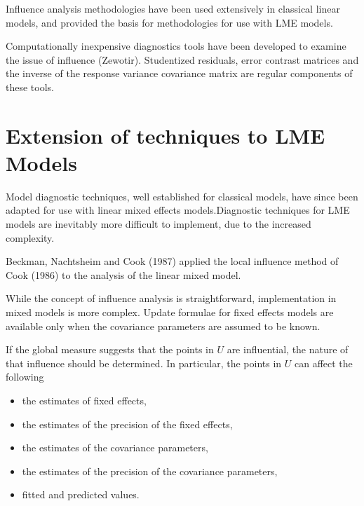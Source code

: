 \documentclass[Main.tex]{subfiles}
\begin{document}
		Influence analysis methodologies have been used extensively in classical linear models, and provided the basis for methodologies for use with LME models.
		
		Computationally inexpensive diagnostics tools have been developed to examine the issue of influence \citep{tewomir} (Zewotir).
		Studentized residuals, error contrast matrices and the inverse of the response variance covariance matrix are regular components of these tools.
		

		

		
		
	
	

		
		\newpage
		\section{Extension of techniques to LME Models} %
		
		Model diagnostic techniques, well established for classical models, have since been adapted for use with linear mixed effects models.Diagnostic techniques for LME models are inevitably more difficult to implement, due to the increased complexity.
		
		Beckman, Nachtsheim and Cook (1987) \citet{Beckman} applied the local influence method of Cook (1986) to the analysis of the linear mixed model.
		
		While the concept of influence analysis is straightforward, implementation in mixed models is more complex. Update formulae for fixed effects models are available only when the covariance parameters are assumed to be known.
		
		If the global measure suggests that the points in $U$ are influential, the nature of that influence should be determined. In particular, the points in $U$ can affect the following
		
		\begin{itemize}
			\item the estimates of fixed effects,
			\item the estimates of the precision of the fixed effects,
			\item the estimates of the covariance parameters,
			\item the estimates of the precision of the covariance parameters,
			\item fitted and predicted values.
		\end{itemize}
		
\end{document}
